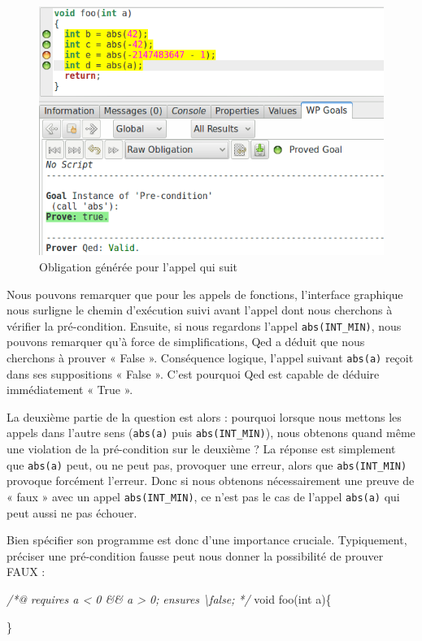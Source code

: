 \documentclass[12pt,francais,]{scrbook}
\newenvironment{Shaded}{}{}
\newcommand{\DataTypeTok}[1]{\textcolor[rgb]{0.56,0.13,0.00}{{#1}}}
\newcommand{\CommentTok}[1]{\textcolor[rgb]{0.38,0.63,0.69}{\textit{{#1}}}}
\newcommand{\NormalTok}[1]{{#1}}
\begin{document}
\begin{figure}[htbp]
\centering
\includegraphics[scale=0.5]{2-1-2-foo-3.png}
\caption{Obligation générée pour l'appel qui suit}
\label{fig:2-1-2-foo-3}
\end{figure}

Nous pouvons remarquer que pour les appels de fonctions, l'interface
graphique nous surligne le chemin d'exécution suivi avant l'appel dont
nous cherchons à vérifier la pré-condition. Ensuite, si nous regardons
l'appel \texttt{abs(INT\_MIN)}, nous pouvons remarquer qu'à force de
simplifications, Qed a déduit que nous cherchons à prouver « False ».
Conséquence logique, l'appel suivant \texttt{abs(a)} reçoit dans ses
suppositions « False ». C'est pourquoi Qed est capable de déduire
immédiatement « True ».

La deuxième partie de la question est alors : pourquoi lorsque nous
mettons les appels dans l'autre sens (\texttt{abs(a)} puis
\texttt{abs(INT\_MIN)}), nous obtenons quand même une violation de la
pré-condition sur le deuxième ? La réponse est simplement que
\texttt{abs(a)} peut, ou ne peut pas, provoquer une erreur, alors que
\texttt{abs(INT\_MIN)} provoque forcément l'erreur. Donc si nous
obtenons nécessairement une preuve de « faux » avec un appel
\texttt{abs(INT\_MIN)}, ce n'est pas le cas de l'appel \texttt{abs(a)}
qui peut aussi ne pas échouer.

Bien spécifier son programme est donc d'une importance cruciale.
Typiquement, préciser une pré-condition fausse peut nous donner la
possibilité de prouver FAUX :

\begin{footnotesize}\begin{Shaded}
\begin{Highlighting}[]
\CommentTok{/*@}
\CommentTok{  requires a < 0 && a > 0;}
\CommentTok{  ensures  \textbackslash{}false;}
\CommentTok{*/}
\DataTypeTok{void} \NormalTok{foo(}\DataTypeTok{int} \NormalTok{a)\{}

\NormalTok{\}}
\end{Highlighting}
\end{Shaded}\end{footnotesize}
\end{document}
